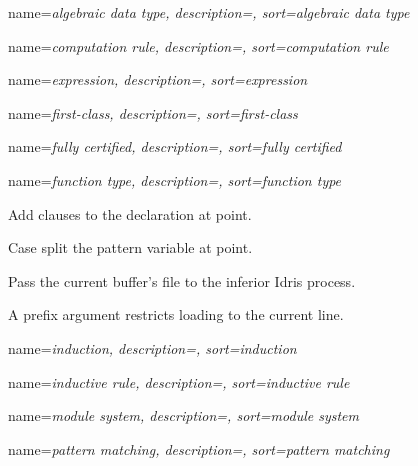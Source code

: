 {
  name=\sl{algebraic data type},
  description={},
  sort={algebraic data type}
}

{
  name=\sl{computation rule},
  description={},
  sort={computation rule}
}

{
  name=\sl{expression},
  description={},
  sort={expression}
}

{
  name=\sl{first-class},
  description={},
  sort={first-class}
}

{
  name=\sl{fully certified},
  description={},
  sort={fully certified}
}

{
  name=\sl{function type},
  description={},
  sort={function type}
}

{

  Add clauses to the declaration at point.
}

{

  Case split the pattern variable at point.
}

{

  Pass the current buffer’s file to the inferior Idris process.

  A prefix argument restricts loading to the current line.
}

{
  name=\sl{induction},
  description={},
  sort={induction}
}

{
  name=\sl{inductive rule},
  description={},
  sort={inductive rule}
}

{
  name=\sl{module system},
  description={},
  sort={module system}
}

{
  name=\sl{pattern matching},
  description={},
  sort={pattern matching}
}

